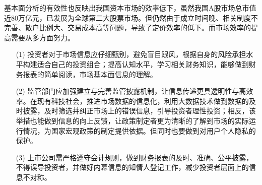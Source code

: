 

基本面分析的有效性也反映出我国资本市场的效率低下，虽然我国A股市场总市值近80万亿元，已发展为全球第二大股票市场。但仍然由于成立时间晚、相关制度不完善、散户比例大、交易成本高等问题，导致了定价效率的低下\cite{wangJiBenMianFenXiZaiZhongGuoAGuShiChangYouYongMaLaiZiJiDuCaiWuBaoBiaoDeZhengJu2018}。而市场效率的提高需要从多方面努力。
\begin{itemize}
\item[(1)] 投资者对于市场信息应仔细甄别，避免盲目跟风，根据自身的风险承担水平构建适合自己的投资组合；提高认知水平，学习相关财务知识，能够做到财务报表的简单阅读，市场基本面信息的理解。

\item[(2)] 监管部门应加强建立与完善监管披露机制，让信息传递更具透明性与高效率。在现有科技社会，推进市场数据的信息化，利用大数据技术做到数据的及时披露，及时筛选并纠正市场上的错误信息，引导投资者理性投资；相反，该举措也能做到信息的向上反馈，让政策制定者更为清晰的了解到市场的实际运行情况，为国家宏观政策的制定提供依据。但同时也要做到对用户个人隐私的保护。

\item[(3)] 上市公司需严格遵守会计规则，做到财务报表的及时、准确、公平披露，不得误导投资者，并做好内幕信息的知情人登记工作，减少投资者层面上的信息不对称。


\end{itemize}


